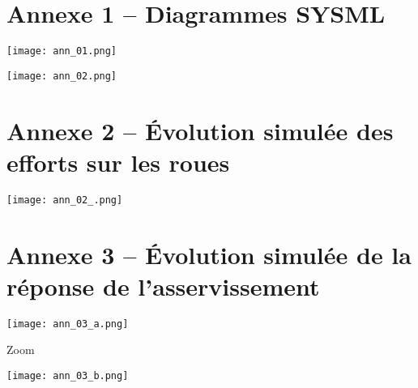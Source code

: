\section*{Annexe 1 -- Diagrammes SYSML}

\begin{center}
\texttt{[image: ann\_01.png]}

\texttt{[image: ann\_02.png]}
\end{center}

\section*{Annexe 2 -- Évolution simulée des efforts sur les roues}

\begin{center}
\texttt{[image: ann\_02\_.png]}
\end{center}


\section*{Annexe 3 -- Évolution simulée de la réponse de l'asservissement}

\begin{center}
\texttt{[image: ann\_03\_a.png]}

\vspace{1cm}

Zoom

\vspace{1cm}

\texttt{[image: ann\_03\_b.png]}
\end{center}

%
%
%
